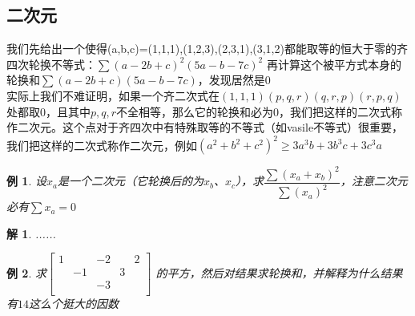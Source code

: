 \documentclass[UTF8]{ctexart}
\newtheorem{1}{例}
\newtheorem{2}{解}
\begin{document}
\subsection{二次元}
我们先给出一个使得(a,b,c)=(1,1,1),(1,2,3),(2,3,1),(3,1,2)都能取等的恒大于零的齐四次轮换不等式：$ \displaystyle \sum (a-2b+c)^{2}(5a-b-7c)^{2} $
再计算这个被平方式本身的轮换和$ \displaystyle \sum (a-2b+c)(5a-b-7c) $，发现居然是$ 0 $\\
实际上我们不难证明，如果一个齐二次式在$ (1,1,1)(p,q,r)(q,r,p)(r,p,q) $处都取$ 0 $，且其中$ p,q,r $不全相等，那么它的轮换和必为$ 0 $，我们把这样的二次式称作二次元。这个点对于齐四次中有特殊取等的不等式（如vasile不等式）很重要，我们把这样的二次式称作二次元，例如$ (a^{2}+b^{2}+c^{2})^{2}\geq 3a^{3}b+3b^{3}c+3c^{3}a $
\begin{1}
设$ x_{a} $是一个二次元（它轮换后的为$ x_{b} $、$ x_{c} $），求$ \dfrac{\displaystyle \sum (x_{a}+x_{b})^{2}}{\displaystyle \sum (x_{a})^{2}}$，注意二次元必有$ \displaystyle \sum x_{a}=0 $	
\end{1}
\begin{2}
	......
\end{2}
\begin{1}
	求$ \left[\begin{matrix}
		1& &-2& &2\\
		&-1& &3&\\
		& &-3& &\\
	\end{matrix}\right] $
的平方，然后对结果求轮换和，并解释为什么结果有$ 14 $这么个挺大的因数
\end{1}
\end{document}
